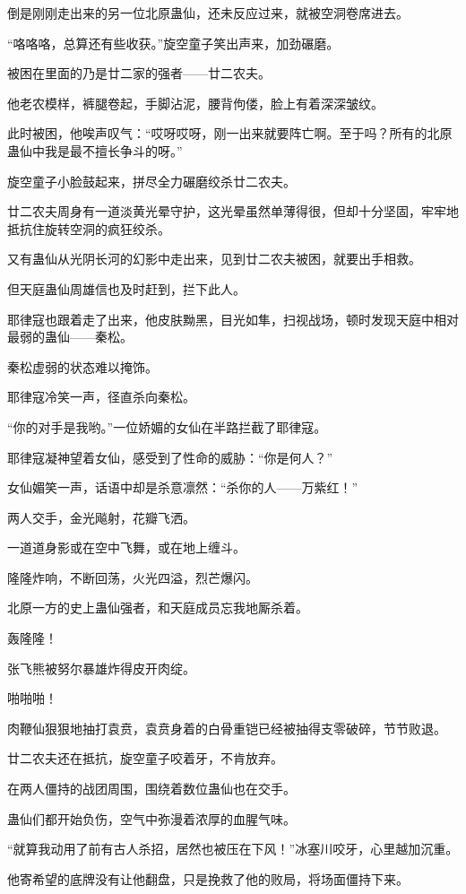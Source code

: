 \begin{this_body}
倒是刚刚走出来的另一位北原蛊仙，还未反应过来，就被空洞卷席进去。

“咯咯咯，总算还有些收获。”旋空童子笑出声来，加劲碾磨。

被困在里面的乃是廿二家的强者——廿二农夫。

他老农模样，裤腿卷起，手脚沾泥，腰背佝偻，脸上有着深深皱纹。

此时被困，他唉声叹气：“哎呀哎呀，刚一出来就要阵亡啊。至于吗？所有的北原蛊仙中我是最不擅长争斗的呀。”

旋空童子小脸鼓起来，拼尽全力碾磨绞杀廿二农夫。

廿二农夫周身有一道淡黄光晕守护，这光晕虽然单薄得很，但却十分坚固，牢牢地抵抗住旋转空洞的疯狂绞杀。

又有蛊仙从光阴长河的幻影中走出来，见到廿二农夫被困，就要出手相救。

但天庭蛊仙周雄信也及时赶到，拦下此人。

耶律寇也跟着走了出来，他皮肤黝黑，目光如隼，扫视战场，顿时发现天庭中相对最弱的蛊仙——秦松。

秦松虚弱的状态难以掩饰。

耶律寇冷笑一声，径直杀向秦松。

“你的对手是我哟。”一位娇媚的女仙在半路拦截了耶律寇。

耶律寇凝神望着女仙，感受到了性命的威胁：“你是何人？”

女仙媚笑一声，话语中却是杀意凛然：“杀你的人——万紫红！”

两人交手，金光飚射，花瓣飞洒。

一道道身影或在空中飞舞，或在地上缠斗。

隆隆炸响，不断回荡，火光四溢，烈芒爆闪。

北原一方的史上蛊仙强者，和天庭成员忘我地厮杀着。

轰隆隆！

张飞熊被努尔暴雄炸得皮开肉绽。

啪啪啪！

肉鞭仙狠狠地抽打袁贲，袁贲身着的白骨重铠已经被抽得支零破碎，节节败退。

廿二农夫还在抵抗，旋空童子咬着牙，不肯放弃。

在两人僵持的战团周围，围绕着数位蛊仙也在交手。

蛊仙们都开始负伤，空气中弥漫着浓厚的血腥气味。

“就算我动用了前有古人杀招，居然也被压在下风！”冰塞川咬牙，心里越加沉重。

他寄希望的底牌没有让他翻盘，只是挽救了他的败局，将场面僵持下来。


\end{this_body}
